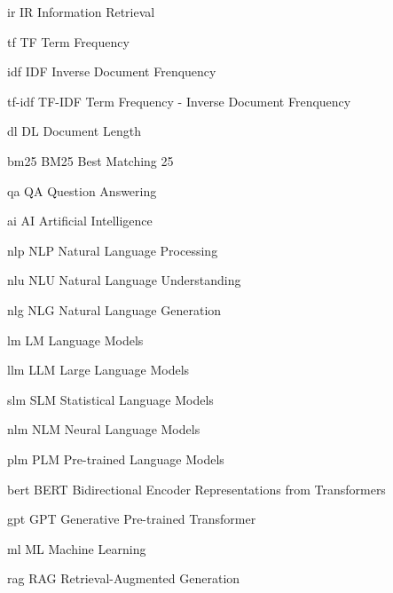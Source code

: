

\newabbreviation
    {ir}
    {IR}
    {Information Retrieval}
\newcommand{\ir}{\gls{ir}}

\newabbreviation
    {tf}
    {TF}
    {Term Frequency}
\newcommand{\tf}{\gls{tf}}

\newabbreviation
    {idf}
    {IDF}
    {Inverse Document Frenquency}
\newcommand{\idf}{\gls{idf}}

\newabbreviation
    {tf-idf}
    {TF-IDF}
    {Term Frequency - Inverse Document Frenquency}
\newcommand{\tfidf}{\gls{tfidf}}

\newabbreviation
    {dl}
    {DL}
    {Document Length}
\newcommand{\dl}{\gls{dl}}


\newabbreviation
    {bm25}
    {BM25}
    {Best Matching 25}
\newcommand{\bm}{\gls{bm}}

\newabbreviation
    {qa}
    {QA}
    {Question Answering}
\newcommand{\qa}{\gls{qa}}

\newabbreviation
    {ai}
    {AI}
    {Artificial Intelligence}
\newcommand{\ai}{\gls{ai}}

\newabbreviation
    {nlp}
    {NLP}
    {Natural Language Processing}
\newcommand{\nlp}{\gls{nlp}}

\newabbreviation
    {nlu}
    {NLU}
    {Natural Language Understanding}
\newcommand{\nlu}{\gls{nlu}}

\newabbreviation
    {nlg}
    {NLG}
    {Natural Language Generation}
\newcommand{\nlg}{\gls{nlg}}

\newabbreviation
    {lm}
    {LM}
    {Language Models}
\newcommand{\lm}{\gls{lm}}

\newabbreviation
    {llm}
    {LLM}
    {Large Language Models}
\newcommand{\llm}{\gls{llm}}

\newabbreviation
    {slm}
    {SLM}
    {Statistical Language Models}
\newcommand{\slm}{\gls{slm}}

\newabbreviation
    {nlm}
    {NLM}
    {Neural Language Models}
\newcommand{\nlm}{\gls{nlm}}

\newabbreviation
    {plm}
    {PLM}
    {Pre-trained Language Models}
\newcommand{\plm}{\gls{plm}}

\newabbreviation
    {bert}
    {BERT}
    {Bidirectional Encoder Representations from Transformers}
\newcommand{\bert}{\gls{bert}}

\newabbreviation
    {gpt}
    {GPT}
    {Generative Pre-trained Transformer}
\newcommand{\gpt}{\gls{gpt}}

\newabbreviation
    {ml}
    {ML}
    {Machine Learning}
\newcommand{\mlearning}{\gls{mlearning}}

\newabbreviation
    {rag}
    {RAG}
    {Retrieval-Augmented Generation}
\newcommand{\rag}{\gls{rag}}